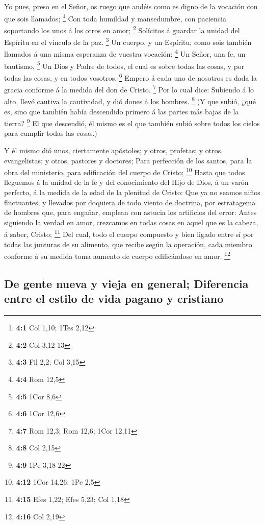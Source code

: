  Yo pues, preso en el Señor, os ruego que andéis como es
digno de la vocación con que sois llamados; \footnote{\textbf{4:1} Col
  1,10; 1Tes 2,12}  Con toda humildad y mansedumbre, con
paciencia soportando los unos á los otros en amor; \footnote{\textbf{4:2}
  Col 3,12-13}  Solícitos á guardar la unidad del Espíritu
en el vínculo de la paz. \footnote{\textbf{4:3} Fil 2,2; Col 3,15}
 Un cuerpo, y un Espíritu; como sois también llamados á una
misma esperanza de vuestra vocación: \footnote{\textbf{4:4} Rom 12,5}
 Un Señor, una fe, un bautismo, \footnote{\textbf{4:5} 1Cor
  8,6}  Un Dios y Padre de todos, el cual es sobre todas las
cosas, y por todas las cosas, y en todos vosotros. \footnote{\textbf{4:6}
  1Cor 12,6}  Empero á cada uno de nosotros es dada la
gracia conforme á la medida del don de Cristo. \footnote{\textbf{4:7}
  Rom 12,3; Rom 12,6; 1Cor 12,11}  Por lo cual dice:
Subiendo á lo alto, llevó cautiva la cautividad, y dió dones á los
hombres. \footnote{\textbf{4:8} Col 2,15}  (Y que subió,
¿qué es, sino que también había descendido primero á las partes más
bajas de la tierra? \footnote{\textbf{4:9} 1Pe 3,18-22}  El
que descendió, él mismo es el que también subió sobre todos los cielos
para cumplir todas las cosas.)

 Y él mismo dió unos, ciertamente apóstoles; y otros,
profetas; y otros, evangelistas; y otros, pastores y doctores;
 Para perfección de los santos, para la obra del
ministerio, para edificación del cuerpo de Cristo; \footnote{\textbf{4:12}
  1Cor 14,26; 1Pe 2,5}  Hasta que todos lleguemos á la
unidad de la fe y del conocimiento del Hijo de Dios, á un varón
perfecto, á la medida de la edad de la plenitud de Cristo: 
Que ya no seamos niños fluctuantes, y llevados por doquiera de todo
viento de doctrina, por estratagema de hombres que, para engañar,
emplean con astucia los artificios del error:  Antes
siguiendo la verdad en amor, crezcamos en todas cosas en aquel que es la
cabeza, á saber, Cristo; \footnote{\textbf{4:15} Efes 1,22; Efes 5,23;
  Col 1,18}  Del cual, todo el cuerpo compuesto y bien
ligado entre sí por todas las junturas de su alimento, que recibe según
la operación, cada miembro conforme á su medida toma aumento de cuerpo
edificándose en amor. \footnote{\textbf{4:16} Col 2,19}

\hypertarget{de-gente-nueva-y-vieja-en-general-diferencia-entre-el-estilo-de-vida-pagano-y-cristiano}{%
\subsection{De gente nueva y vieja en general; Diferencia entre el
estilo de vida pagano y
cristiano}\label{de-gente-nueva-y-vieja-en-general-diferencia-entre-el-estilo-de-vida-pagano-y-cristiano}}

